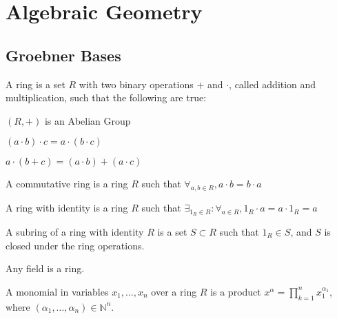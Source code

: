 \documentclass[crop=false,class=article,oneside]{standalone}
\begin{document}
    \ifx\ifsub\undefined
        \section*{Algebraic Geometry}
        \setcounter{section}{1}
    \fi
    \subsection{Groebner Bases}
        \begin{definition}
            A ring is a set $R$ with two binary operations $+$
            and $\cdot$, called addition and multiplication,
            such that the following are true:
            \begin{enumerate}
                \begin{multicols}{3}
                    \item $(R,+)$ is an Abelian Group
                    \item $(a\cdot{b})\cdot{c}=a\cdot(b\cdot{c})$
                    \item $a\cdot(b+c)=(a\cdot b)+(a\cdot c)$
                \end{multicols}
            \end{enumerate}
        \end{definition}
        \begin{definition}
            A commutative ring is a ring $R$ such that
            $\forall_{a,b\in R},a\cdot{b}=b\cdot{a}$
        \end{definition}
        \begin{definition}
            A ring with identity is a ring $R$ such that
            $\exists_{1_{R}\in R}:\forall_{a\in R}, 1_{R}\cdot a=a\cdot 1_{R}=a$
        \end{definition}
        \begin{definition}
            A subring of a ring with identity $R$ is a set
            $S\subset R$ such that $1_{R}\in S$, and $S$ is
            closed under the ring operations.
        \end{definition}
        \begin{remark}
            Any field is a ring.
        \end{remark}
        \begin{definition}
            A monomial in variables $x_1,\hdots, x_n$ over a
            ring $R$ is a product
            $x^\alpha=\prod_{k=1}^{n} x_1^{\alpha_1}$,
            where $(\alpha_1,\hdots,\alpha_n)\in \mathbb{N}^n$.
        \end{definition}
\end{document}
